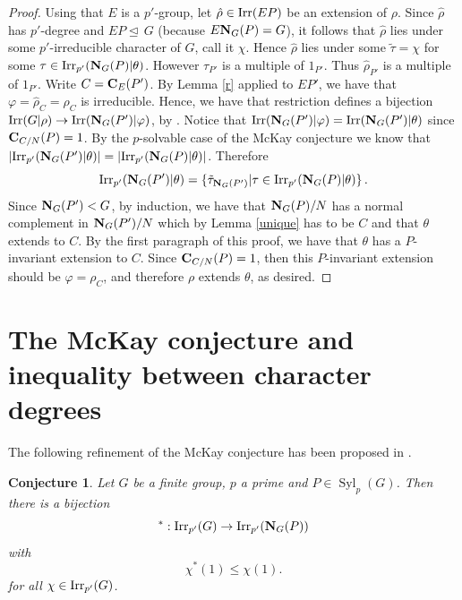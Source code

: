 \documentclass[12pt]{amsart}
\theoremstyle{plain}
\newtheorem{conj}[thm]{Conjecture}
\theoremstyle{definition}
\numberwithin{equation}{section}
\newcommand{\Syl}{\operatorname{Syl}}
\newcommand{\Irr}{\operatorname{Irr}}
\def\irrp#1{{\rm Irr}_{p'}(#1)}
\def\irr#1{{\rm Irr}(#1)}
\def\cent#1#2{{\bf C}_{#1}(#2)}
\def\nor{\trianglelefteq\,}
\def\norm#1#2{{\bf N}_{#1}(#2)}
\begin{document}
\begin{proof}
Using that $E$ is a $p'$-group, let $\hat\rho \in \irr{EP}$ be an
extension of $\rho$. Since $\hat\rho$ has $p'$-degree and $EP \nor
G$ (because $E \norm GP=G$), it follows that $\hat\rho$ lies under
some $p'$-irreducible character of $G$, call it $\chi$. Hence
$\hat\rho$ lies under some $\tilde\tau=\chi$ for some $\tau \in
\irrp{\norm GP|\theta}$. However $\tau_{P'}$ is a multiple of
$1_{P'}$. Thus $\hat\rho_{P'}$ is a multiple of $1_{P'}$. Write $C=\cent E{P'}$. By Lemma
\ref{r} applied to $EP'$, we have that $\varphi=\hat\rho_{C}=\rho_C$ is irreducible.
 Hence, we have that restriction defines a
bijection $\irr{G|\rho} \rightarrow \irr{\norm G{P'}|\varphi}$, by
\cite[Lemma 6.8(d)]{N}. Notice that $\irr{\norm
G{P'}|\varphi}=\irr{\norm G{P'}|\theta}$ since $\cent{C/N}P=1$. By
the $p$-solvable case of the McKay conjecture \cite[Theorem
10.26]{N} we know that $|\irrp{\norm G{P'}|\theta}|=|\irrp{\norm
GP|\theta}|$. Therefore
$$\irrp{\norm G{P'}|\theta}=\{ \tilde\tau_{\norm G{P'}} |\tau \in \irrp{\norm GP|\theta}\} \, .$$
Since $\norm G{P'}<G$, by induction, we have that $\norm GP/N$ has a normal complement in
$\norm G{P'}/N$ which by Lemma \ref{unique} has to be $C$ and that
$\theta$ extends to $C$. By the first paragraph of this proof, we
have that $\theta$ has a $P$-invariant extension to $C$.
Since $\cent{C/N}P=1$, then this
$P$-invariant extension should be $\varphi=\rho_C$, and therefore
$\rho$ extends $\theta$, as desired.
\end{proof}




\section{The McKay conjecture and inequality between character degrees}

The following refinement of the McKay conjecture has been proposed
in \cite{G}.


\begin{conj}\label{conj:Giannelli-McKay}
Let $G$ be a finite group, $p$ a prime and $P\in\Syl_p(G)$. Then
there is a bijection
$$^*:\Irr_{p'}(G)\rightarrow\Irr_{p'}(\norm G P)$$
with \[\chi^*(1)\leq\chi(1).\] for all $\chi\in\irrp{G}$.
\end{conj}
\end{document}

